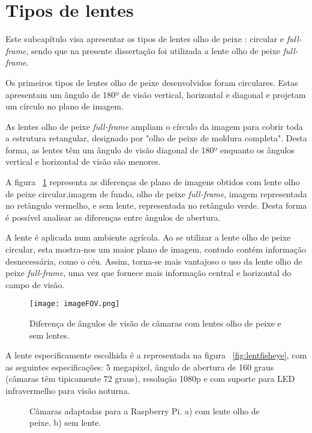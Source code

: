 \section{Tipos de lentes}

Este subcapítulo visa apresentar os tipos de lentes olho de peixe : circular e \textit{full-frame}, sendo que na presente dissertação  foi utilizada a lente olho de peixe \textit{full-frame}.

Os primeiros tipos de lentes olho de peixe desenvolvidos foram circulares. Estas apresentam um ângulo de 180º de visão vertical, horizontal e diagonal e projetam um círculo no plano de imagem.

As lentes olho de peixe \textit{full-frame} ampliam o círculo da imagem para cobrir toda a estrutura retangular, designado por "olho de peixe de moldura completa". Desta forma, as lentes têm um ângulo de visão diagonal de 180º enquanto os ângulos vertical e horizontal de visão são menores. 

A figura ~\ref{fig:circularfullframe} representa as diferenças de plano de imagens obtidos com lente olho de peixe circular,imagem de fundo, olho de peixe \textit{full-frame}, imagem representada no retângulo vermelho, e sem lente, representada no retângulo verde. Desta forma é possível analisar as diferenças entre ângulos de abertura.


A lente é aplicada num ambiente agrícola. Ao se utilizar a lente olho de peixe circular, esta mostra-nos um maior plano de imagem, contudo contém informação desnecessária, como o céu. Assim, torna-se mais vantajoso o uso da lente olho de peixe \textit{full-frame}, uma vez que fornece mais informação central e horizontal do campo de visão.

\begin{figure}[h!] %
	\begin{center}
		\leavevmode		
		\texttt{[image: imageFOV.png]}
		\caption{Diferença de ângulos de visão de câmaras com  lentes olho de peixe e sem lentes.}
		\label{fig:circularfullframe}
	\end{center}
\end{figure}


A lente especificamente escolhida é a representada na figura ~\ref{fig:lentfisheye}, com as seguintes especificações: 5 megapíxel, ângulo de abertura de 160 graus (câmaras têm tipicamente 72 graus), resolução 1080p e com suporte para LED infravermelho para visão noturna.


\begin{figure}[!htbp]
	\centering
	\qquad
	\caption{Câmaras adaptadas para a Raspberry Pi. a) com lente olho de peixe. b) sem lente.}
	\label{fig:lentfisheyeall}
\end{figure}

